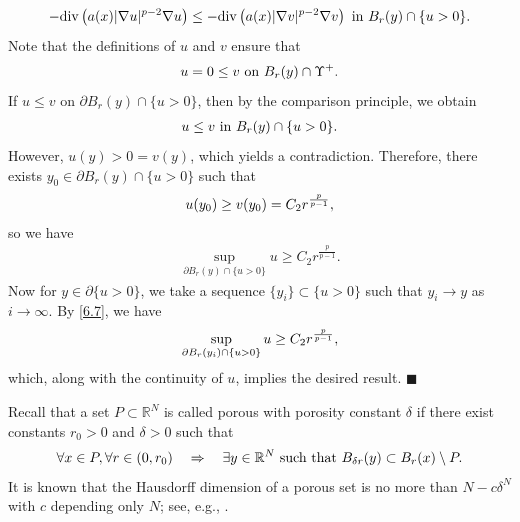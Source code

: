 \documentclass[onecolumn]{autart}
\newenvironment{proof}{{\it Proof: \enspace}}{\hfill $\blacksquare$\par}
\begin{document}
\begin{proof}
		\begin{align}
			-\mathrm{div}\left(a(x)|\nabla u|^{p-2}\nabla u\right) \leq -\mathrm{div}\left(a(x)|\nabla v|^{p-2}\nabla v\right)\   \text{in}\   B_r(y) \cap \{u > 0\}.\notag
		\end{align}
		Note that the definitions of $u$ and $v$ ensure that
		\begin{align}
			u=0\leq v \text{ on } B_{r}(y)\cap\Upsilon^{+}.\notag
		\end{align}
		If $u\leq v$ on $\partial B_{r}(y)\cap\{u>0\}$, then by the comparison principle, we obtain
		\begin{align}
			u\leq v  \text{ in } B_{r}(y)\cap\{u>0\}.\notag
		\end{align}
		However, $u(y)>0=v(y)$, which yields a contradiction. Therefore, there exists $y_{0}\in\partial B_{r}(y)\cap\{u>0\}$ such that
		\begin{align}
			u(y_{0})\geq v(y_{0})=C_2 r^{\frac{p}{p-1}},\notag
		\end{align}
		so we have
		\begin{align}\label{6.7}
			\sup_{\partial B_{r}(y)\cap\{u>0\}}u\geq C_2r^{\frac{p}{p-1}}.
		\end{align}
		Now for $y \in \partial\{u > 0\}$, we take a sequence $\{y_i\} \subset \{u > 0\}$ such that $y_i \to y$ as $i \to \infty$. By \eqref{6.7}, we have
		\begin{align}
			\sup_{\partial B_r(y_i) \cap \{u > 0\}} u \geq C_2 r^{\frac{p}{p-1}},\notag
		\end{align}
		which, along with the continuity of $u$, implies the desired result.
	\end{proof}
	
	Recall that a set $ P \subset \mathbb{R}^N $ is called porous with porosity constant $\delta$ if there exist constants $ r_0 > 0 $ and $ \delta > 0 $ such that
	\begin{align}
		\forall x \in P,  \forall r \in (0, r_0) \quad \Rightarrow \quad
		\exists y \in \mathbb{R}^N \text{ such   that } B_{\delta r}(y) \subset B_r(x) \setminus P.\notag
	\end{align}
	It is known that the Hausdorff dimension of a porous set  is no more than $N - c\delta^N$ with $c$ depending only $N$; {see, e.g., \cite{Koskela:1997,Martio:1987}.}
	
\end{document}
